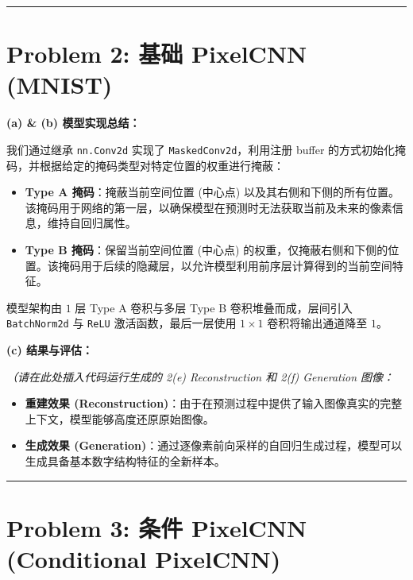 \documentclass[a4paper, 11pt]{ctexart}
\begin{document}
\vspace{1em}
\hrule
\vspace{1em}

\section*{Problem 2: 基础 PixelCNN (MNIST)}

\textbf{(a) \& (b) 模型实现总结：}

我们通过继承 \texttt{nn.Conv2d} 实现了 \texttt{MaskedConv2d}，利用注册 buffer 的方式初始化掩码，并根据给定的掩码类型对特定位置的权重进行掩蔽：
\begin{itemize}
    \item \textbf{Type A 掩码}：掩蔽当前空间位置 (中心点) 以及其右侧和下侧的所有位置。该掩码用于网络的第一层，以确保模型在预测时无法获取当前及未来的像素信息，维持自回归属性。
    \item \textbf{Type B 掩码}：保留当前空间位置 (中心点) 的权重，仅掩蔽右侧和下侧的位置。该掩码用于后续的隐藏层，以允许模型利用前序层计算得到的当前空间特征。
\end{itemize}
模型架构由 $1$ 层 Type A 卷积与多层 Type B 卷积堆叠而成，层间引入 \texttt{BatchNorm2d} 与 \texttt{ReLU} 激活函数，最后一层使用 $1 \times 1$ 卷积将输出通道降至 $1$。

\textbf{(c) 结果与评估：}

\textit{（请在此处插入代码运行生成的 2(e) Reconstruction 和 2(f) Generation 图像：}
\begin{center}
\end{center}

\begin{itemize}
    \item \textbf{重建效果 (Reconstruction)}：由于在预测过程中提供了输入图像真实的完整上下文，模型能够高度还原原始图像。
    \item \textbf{生成效果 (Generation)}：通过逐像素前向采样的自回归生成过程，模型可以生成具备基本数字结构特征的全新样本。
\end{itemize}

\vspace{1em}
\hrule
\vspace{1em}

\section*{Problem 3: 条件 PixelCNN (Conditional PixelCNN)}
\end{document}
